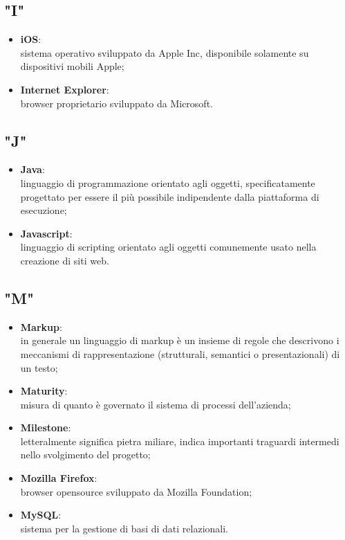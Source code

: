 \subsection*{"I"}
\begin{itemize}
\itemsep2em
\item \textbf{iOS}:\\ sistema operativo sviluppato da Apple Inc, disponibile solamente su dispositivi mobili Apple;
\item \textbf{Internet Explorer}:\\ browser proprietario sviluppato da Microsoft.
\end{itemize}

\subsection*{"J"}
\begin{itemize}
\itemsep2em
\item \textbf{Java}:\\ linguaggio di programmazione orientato agli oggetti, specificatamente progettato per essere il più possibile indipendente dalla piattaforma di esecuzione;
\item \textbf{Javascript}:\\ linguaggio di scripting orientato agli oggetti comunemente usato nella creazione di siti web.
\end{itemize}

\subsection*{"M"}
\begin{itemize}
\itemsep2em
\item \textbf{Markup}:\\ in generale un linguaggio di markup è un insieme di regole che descrivono i meccanismi di rappresentazione (strutturali, semantici o presentazionali) di un testo;
\item \textbf{Maturity}:\\ misura di quanto è governato il sistema di processi dell'azienda;
\item \textbf{Milestone}:\\ letteralmente significa pietra miliare, indica importanti traguardi intermedi nello svolgimento del progetto;
\item \textbf{Mozilla Firefox}:\\ browser opensource sviluppato da Mozilla Foundation;
\item \textbf{MySQL}:\\ sistema per la gestione di basi di dati relazionali.
\end{itemize}

